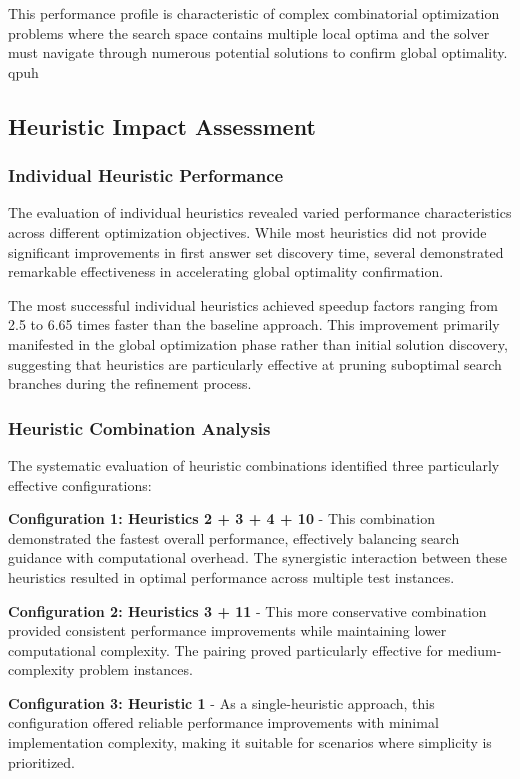 \documentclass[11pt,a4paper]{article}
\begin{document}
This performance profile is characteristic of complex combinatorial optimization problems where the search space contains multiple local optima and the solver must navigate through numerous potential solutions to confirm global optimality.
qpuh
\subsection{Heuristic Impact Assessment}

\subsubsection{Individual Heuristic Performance}

The evaluation of individual heuristics revealed varied performance characteristics across different optimization objectives. While most heuristics did not provide significant improvements in first answer set discovery time, several demonstrated remarkable effectiveness in accelerating global optimality confirmation.

The most successful individual heuristics achieved speedup factors ranging from 2.5 to 6.65 times faster than the baseline approach. This improvement primarily manifested in the global optimization phase rather than initial solution discovery, suggesting that heuristics are particularly effective at pruning suboptimal search branches during the refinement process.

\subsubsection{Heuristic Combination Analysis}

The systematic evaluation of heuristic combinations identified three particularly effective configurations:

\textbf{Configuration 1: Heuristics 2 + 3 + 4 + 10} - This combination demonstrated the fastest overall performance, effectively balancing search guidance with computational overhead. The synergistic interaction between these heuristics resulted in optimal performance across multiple test instances.

\textbf{Configuration 2: Heuristics 3 + 11} - This more conservative combination provided consistent performance improvements while maintaining lower computational complexity. The pairing proved particularly effective for medium-complexity problem instances.

\textbf{Configuration 3: Heuristic 1} - As a single-heuristic approach, this configuration offered reliable performance improvements with minimal implementation complexity, making it suitable for scenarios where simplicity is prioritized.
\end{document}
